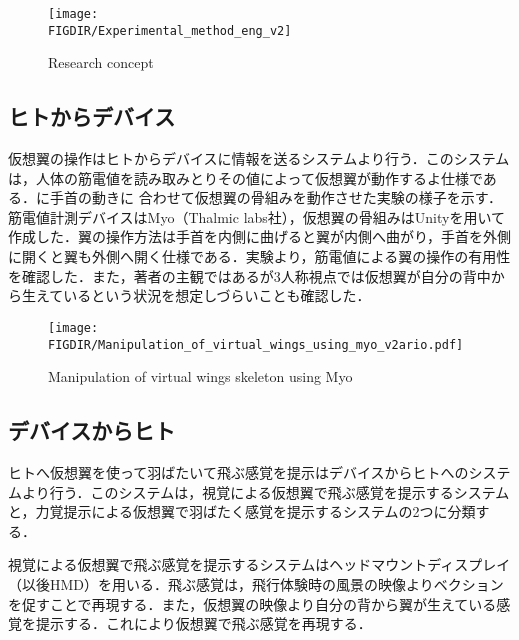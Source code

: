 \begin{small}
  \begin{figure}[t]
    \begin{center}
      \texttt{[image: \\FIGDIR/Experimental\_method\_eng\_v2]}%
      \caption{Research concept}
    \end{center}
  \end{figure}

  \subsection{ヒトからデバイス}
    仮想翼の操作はヒトからデバイスに情報を送るシステムより行う．このシステムは，人体の筋電値を読み取みとりその値によって仮想翼が動作するよ仕様である．に手首の動きに
    合わせて仮想翼の骨組みを動作させた実験の様子を示す．筋電値計測デバイスはMyo（Thalmic labs社），仮想翼の骨組みはUnityを用いて作成した．翼の操作方法は手首を内側に曲げると翼が内側へ曲がり，手首を外側に開くと翼も外側へ開く仕様である．実験より，筋電値による翼の操作の有用性を確認した．また，著者の主観ではあるが3人称視点では仮想翼が自分の背中から生えているという状況を想定しづらいことも確認した．

    \begin{figure}[t]
      \begin{center}
        \vspace{3mm}
        \texttt{[image: \\FIGDIR/Manipulation\_of\_virtual\_wings\_using\_myo\_v2ario.pdf]}%
        \caption{Manipulation of virtual wings skeleton using Myo}
      \end{center}
    \end{figure}
    
    
  \subsection{デバイスからヒト}
    ヒトへ仮想翼を使って羽ばたいて飛ぶ感覚を提示はデバイスからヒトへのシステムより行う．このシステムは，視覚による仮想翼で飛ぶ感覚を提示するシステムと，力覚提示による仮想翼で羽ばたく感覚を提示するシステムの2つに分類する．
    
    視覚による仮想翼で飛ぶ感覚を提示するシステムはヘッドマウントディスプレイ（以後HMD）を用いる．飛ぶ感覚は，飛行体験時の風景の映像よりベクションを促すことで再現する．また，仮想翼の映像より自分の背から翼が生えている感覚を提示する．これにより仮想翼で飛ぶ感覚を再現する．


\end{small}
